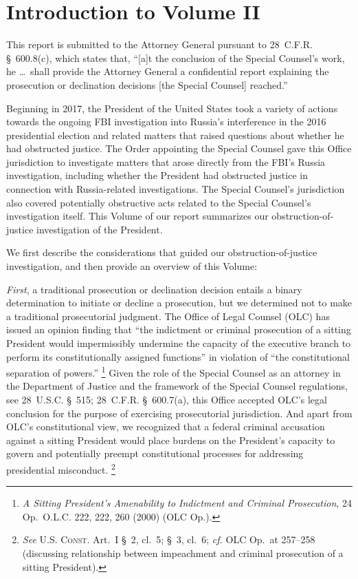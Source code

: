 \section*{Introduction to Volume II}
\label{sec:introduction-2}

This report is submitted to the Attorney General pursuant to 28~C.F.R. \S~600.8(c), which states that, ``[a]t the conclusion of the Special Counsel's work, he \dots\ shall provide the Attorney General a confidential report explaining the prosecution or declination decisions [the Special Counsel] reached.''

Beginning in 2017, the President of the United States took a variety of actions towards the ongoing FBI investigation into Russia's interference in the 2016 presidential election and related matters that raised questions about whether he had obstructed justice.
The Order appointing the Special Counsel gave this Office jurisdiction to investigate matters that arose directly from the FBI's Russia investigation, including whether the President had obstructed justice in connection with Russia-related investigations.
The Special Counsel's jurisdiction also covered potentially obstructive acts related to the Special Counsel's investigation itself.
This Volume of our report summarizes our obstruction-of-justice investigation of the President.

We first describe the considerations that guided our obstruction-of-justice investigation, and then provide an overview of this Volume:

\textit{First}, a traditional prosecution or declination decision entails a binary determination to initiate or decline a prosecution, but we determined not to make a traditional prosecutorial judgment.
The Office of Legal Counsel (OLC) has issued an opinion finding that ``the indictment or criminal prosecution of a sitting President would impermissibly undermine the capacity of the executive branch to perform its constitutionally assigned functions'' in violation of ``the constitutional separation of powers.''%
\footnote{\textit{A Sitting President's Amenability to Indictment and Criminal Prosecution}, 24 Op.\ O.L.C. 222, 222, 260 (2000) (OLC Op.).}
Given the role of the Special Counsel as an attorney in the Department of Justice and the framework of the Special Counsel regulations, see 28~U.S.C. \S~515; 28~C.F.R. \S~600.7(a), this Office accepted OLC's legal conclusion for the purpose of exercising prosecutorial jurisdiction.
And apart from OLC's constitutional view, we recognized that a federal criminal accusation against a sitting President would place burdens on the President's capacity to govern and potentially preempt constitutional processes for addressing presidential misconduct.%
\footnote{\textit{See} \textsc{U.S. Const.} Art.~I \S~2, cl.~5; \S~3, cl.~6; \textit{cf.} OLC Op.\ at 257--258 (discussing relationship between impeachment and criminal prosecution of a sitting President).}

